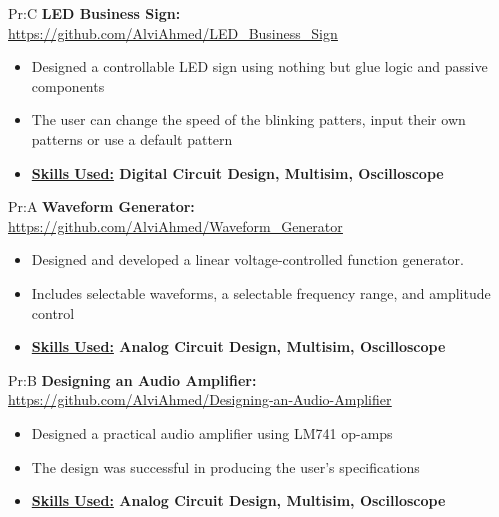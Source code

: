 

Pr:C
\textbf{LED Business Sign: }
\underline{\url{https://github.com/AlviAhmed/LED_Business_Sign}}
\begin{itemize}[noitemsep,nolistsep]
\item Designed a controllable LED sign using nothing but glue logic and passive components
\item The user can change the speed of the blinking patters, input their own patterns or
  use a default pattern
\item \textbf{ \underline{Skills Used:} Digital Circuit Design, Multisim, Oscilloscope}
\end{itemize}


Pr:A
\textbf{Waveform Generator: }
\underline{\url{https://github.com/AlviAhmed/Waveform_Generator}}
\begin{itemize}[noitemsep,nolistsep]
\item Designed and developed a linear voltage-controlled function generator. 
\item Includes selectable waveforms, a selectable frequency range, and amplitude control
\item \textbf{ \underline{Skills Used:} Analog Circuit Design, Multisim, Oscilloscope}
\end{itemize}            


Pr:B
\textbf{Designing an Audio Amplifier: }
\underline{\url{https://github.com/AlviAhmed/Designing-an-Audio-Amplifier}}
\begin{itemize}[noitemsep,nolistsep]
\item Designed a practical audio amplifier using LM741 op-amps
\item The design was successful in producing the user's specifications
\item \textbf{ \underline{Skills Used:} Analog Circuit Design, Multisim, Oscilloscope}
\end{itemize}













